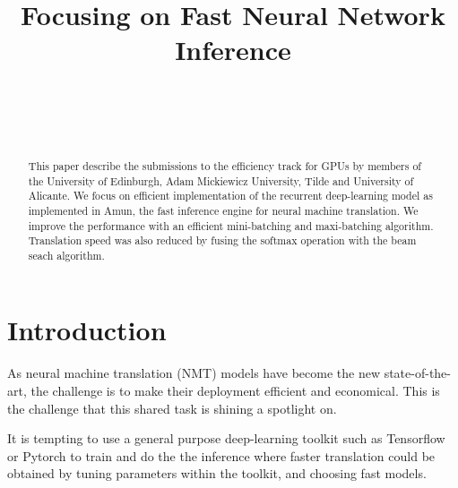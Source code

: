 \documentclass[11pt,a4paper]{article}
\begin{document}
\title{\bf Focusing on Fast Neural Network Inference}  

\author{ \hfill  {}\\ 
        \addr{}
\AND
        \hfill {}\\
\AND
        \hfill {}\\
}

\maketitle
\pagestyle{empty}

\begin{abstract}

This paper describe the submissions to the efficiency track for GPUs by members of the University of Edinburgh, Adam Mickiewicz University, Tilde and University of Alicante. We focus on efficient implementation of the recurrent deep-learning model as implemented in Amun, the fast inference engine for neural machine translation. We improve the performance with an efficient mini-batching and maxi-batching algorithm. Translation speed was also reduced by fusing the softmax operation with the beam seach algorithm.


\end{abstract}

\section{Introduction}
\label{sec:Introduction}

As neural machine translation (NMT) models have become the new state-of-the-art, the challenge is to make their deployment efficient and economical. This is the challenge that this shared task is shining a spotlight on.

It is tempting to use a general purpose deep-learning toolkit such as Tensorflow or Pytorch to train and do the the inference where faster translation could be obtained by tuning parameters within the toolkit, and choosing fast models. %
\end{document}
